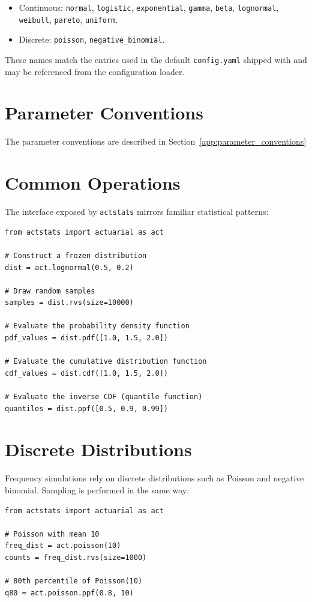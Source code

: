 \begin{itemize}[leftmargin=*]
    \item Continuous: \texttt{normal}, \texttt{logistic},
          \texttt{exponential}, \texttt{gamma}, \texttt{beta},
          \texttt{lognormal}, \texttt{weibull}, \texttt{pareto},
          \texttt{uniform}.
    \item Discrete: \texttt{poisson}, \texttt{negative\_binomial}.
\end{itemize}

These names match the entries used in the default \texttt{config.yaml}
shipped with \actsim and may be referenced from the configuration loader.

\section{Parameter Conventions}
The parameter conventions are described in Section~\ref{app:parameter_conventions}

\section{Common Operations}

The interface exposed by \texttt{actstats} mirrors familiar statistical
patterns:

\begin{lstlisting}[style=pythonstyle]
from actstats import actuarial as act

# Construct a frozen distribution
dist = act.lognormal(0.5, 0.2)

# Draw random samples
samples = dist.rvs(size=10000)

# Evaluate the probability density function
pdf_values = dist.pdf([1.0, 1.5, 2.0])

# Evaluate the cumulative distribution function
cdf_values = dist.cdf([1.0, 1.5, 2.0])

# Evaluate the inverse CDF (quantile function)
quantiles = dist.ppf([0.5, 0.9, 0.99])
\end{lstlisting}

\section{Discrete Distributions}

Frequency simulations rely on discrete distributions such as Poisson
and negative binomial. Sampling is performed in the same way:

\begin{lstlisting}[style=pythonstyle]
from actstats import actuarial as act

# Poisson with mean 10
freq_dist = act.poisson(10)
counts = freq_dist.rvs(size=1000)

# 80th percentile of Poisson(10)
q80 = act.poisson.ppf(0.8, 10)
\end{lstlisting}

